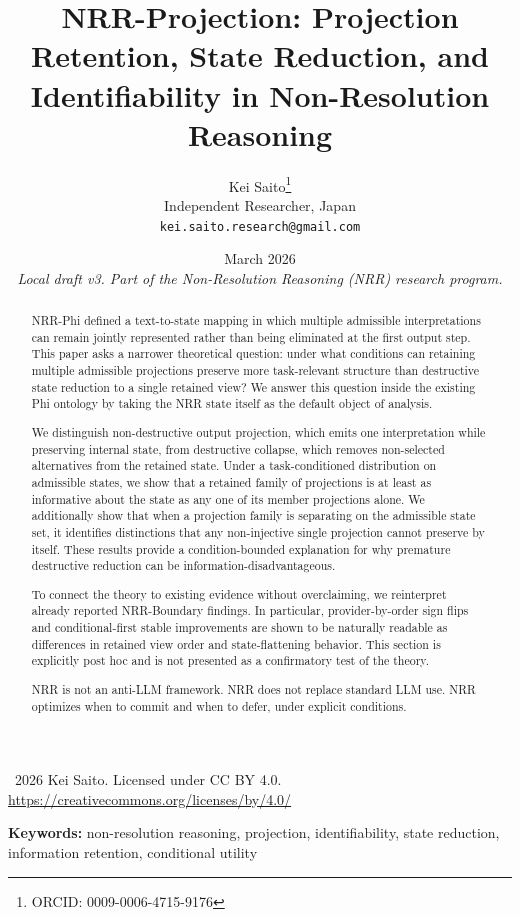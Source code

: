 \documentclass[11pt,a4paper]{article}
\title{\textbf{NRR-Projection: Projection Retention, State Reduction, and Identifiability in Non-Resolution Reasoning}}
\author{
  Kei Saito\thanks{ORCID: 0009-0006-4715-9176} \\
  Independent Researcher, Japan \\
  \texttt{kei.saito.research@gmail.com}
}
\date{March 2026 \\[0.5em]
\textit{Local draft v3. Part of the Non-Resolution Reasoning (NRR) research program.}}
\begin{document}
\maketitle

\begin{center}
\textcopyright\ 2026 Kei Saito.
Licensed under CC BY 4.0.\\
\url{https://creativecommons.org/licenses/by/4.0/}
\end{center}

\begin{abstract}
NRR-Phi defined a text-to-state mapping in which multiple admissible interpretations can remain jointly represented rather than being eliminated at the first output step. This paper asks a narrower theoretical question: under what conditions can retaining multiple admissible projections preserve more task-relevant structure than destructive state reduction to a single retained view? We answer this question inside the existing Phi ontology by taking the NRR state itself as the default object of analysis.

We distinguish non-destructive output projection, which emits one interpretation while preserving internal state, from destructive collapse, which removes non-selected alternatives from the retained state. Under a task-conditioned distribution on admissible states, we show that a retained family of projections is at least as informative about the state as any one of its member projections alone. We additionally show that when a projection family is separating on the admissible state set, it identifies distinctions that any non-injective single projection cannot preserve by itself. These results provide a condition-bounded explanation for why premature destructive reduction can be information-disadvantageous.

To connect the theory to existing evidence without overclaiming, we reinterpret already reported NRR-Boundary findings. In particular, provider-by-order sign flips and conditional-first stable improvements are shown to be naturally readable as differences in retained view order and state-flattening behavior. This section is explicitly post hoc and is not presented as a confirmatory test of the theory.

NRR is not an anti-LLM framework. NRR does not replace standard LLM use. NRR optimizes when to commit and when to defer, under explicit conditions.
\end{abstract}

\noindent\textbf{Keywords:} non-resolution reasoning, projection, identifiability, state reduction, information retention, conditional utility
\end{document}
